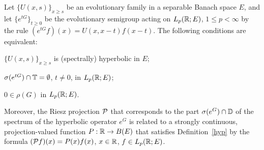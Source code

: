 \begin{thm}
Let $\{U(x,s)\}_{x\geq s}$ be an evolutionary family in a separable
Banach space $E$, and let
$\{e^{tG}\}_{t\geq 0}$ be the evolutionary semigroup acting on
$L_p({\Bbb{R}};E)$, $1\leq p < \infty$
by the rule $(e^{tG}f)(x) =U(x,x-t)f(x-t)$.  The
following conditions are equivalent:
\begin{list}{)}{}
\item $\{U(x,s)\}_{x\geq s}$ is (spectrally) hyperbolic in $E$;
\item $\sigma (e^{tG}) \cap {\Bbb{T}} =\emptyset$, $t\neq 0$, in $L_p ({\Bbb{R}};E)$;
\item $0\in\rho (G)$ in $L_p ({\Bbb{R}};E)$.
\end{list}
Moreover, the Riesz projection ${\cal{P}}$ that corresponds to the part $\sigma
(e^G)\cap {\Bbb{D}}$ of the spectrum of the hyperbolic operator $e^G$ is related
to a strongly continuous, projection-valued function $P:{\Bbb{R}} \to B(E)$
that satisfies Definition~\ref{hyp} by the formula $({\cal{P}} f)(x) =P(x) f(x)$,
$x\in{\Bbb{R}}$, $f\in L_p({\Bbb{R}};E)$.
\end{thm}

